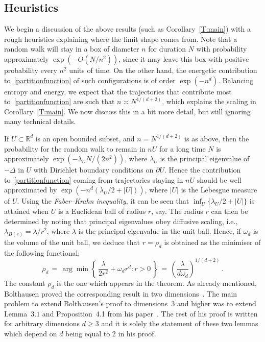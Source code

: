 \documentclass[10pt]{amsart}
\theoremstyle{definition}\newtheorem{defi}[theo]{Definition}\newtheorem{rema}[theo]{Remark}\newtheorem{exam}[theo]{Example}\newtheorem{exem}[theo]{Example}\newtheorem{nota}[theo]{Notation}
\newcommand*\R{\mathbb{R}}
\begin{document}
\subsection{Heuristics}

We begin a discussion of the above results (such as Corollary~\ref{T:main}) with a rough heuristics explaining where the limit shape comes from. Note that a random walk will stay in a box of diameter $n$ for duration $N$ with probability approximately $\exp(- O(N/n^2))$, since it may leave this box with positive probability every $n^2$ units of time. On the other hand, the energetic contribution to~\eqref{partitionfunction} of such configurations is of order $\exp (- n^d)$. Balancing entropy and energy, we expect that the trajectories that contribute most to~\eqref{partitionfunction} are such that $n \asymp N^{1/(d+2)}$, which explains the scaling in Corollary~\ref{T:main}. We now discuss this in a bit more detail, but still ignoring many technical details.

If $U\subset \R^d$ is an open bounded subset, and $n = N^{1/ (d+2)}$ is as above, then the probability for the random walk to remain in $nU$ for a long time $N$ is approximately $\exp (- \lambda_U N/(2n^2))$, where $\lambda_U$ is the principal eigenvalue of $- \Delta$ in $U$ with Dirichlet boundary conditions on $\partial U$. Hence the contribution to~\eqref{partitionfunction} coming from trajectories staying in $nU$ should be well approximated by $\exp (- n^d (\lambda_U/2 + |U|))$, where $|U|$ is the Lebesgue measure of $U$. Using the \emph{Faber--Krahn inequality}, it can be seen that $\inf_U \{\lambda_U/2 + |U|\}$ is attained when $U$ is a Euclidean ball of radius $r$, say. The radius $r$ can then be determined by noting that principal eigenvalues obey diffusive scaling, i.e., $\lambda_{B(r) } = \lambda / r^2$, where $\lambda$ is the principal eigenvalue in the unit ball. Hence, if $\omega_d $ is the volume of the unit ball, we deduce that $r = \rho_d$ is obtained as the minimiser of the following functional:
\[
\rho_d \,=\,\arg \min \left\{\,\frac{\lambda}{2r^2} + \omega_d r^d:r>0\,\right\}\, = \,\left(\frac{\lambda}{d \omega_d} \right)^{1/ (d+2)}\,.
\]
The constant $\rho_d$ is the one which appears in the theorem. As already mentioned, Bolthausen proved the corresponding result in two dimensions~\cite{BO}. The main problem to extend Bolthausen's proof to dimensions~$3$ and higher was to extend Lemma~$3.1$ and Proposition~4.1 from his paper~\cite{BO}. The rest of his proof is written for arbitrary dimensions $d\ge 3$ and it is solely the statement of these two lemmas which depend on $d$ being equal to 2 in his proof.
\end{document}
